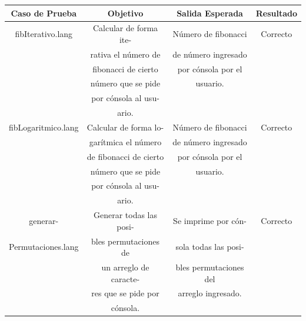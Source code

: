 \documentclass[11pt, spanish]{report}
\begin{document}
\begin{itemize}
  \begin{table}[!hbp]
    \begin{tabular}{c c c c}
      \hline            
      \hline            
      Caso de Prueba      & Objetivo               & Salida Esperada & Resultado \\ [0.5ex]
      \hline                         
      fibIterativo.lang   & Calcular de forma ite- & N\'umero de fibonacci & Correcto         \\ [1ex] 
                          & rativa el n\'umero de  & de n\'umero ingresado &                  \\ [1ex] 
                          & fibonacci de cierto    & por c\'onsola por el  &                  \\ [1ex] 
                          & n\'umero que se pide   & usuario.              &                  \\ [1ex] 
                          & por c\'onsola al usu-  &                       &                  \\ [1ex]   
                          & ario.                  &                       &                  \\ [1ex]   
      fibLogaritmico.lang & Calcular de forma lo-  & N\'umero de fibonacci & Correcto         \\ [1ex] 
                          & gar\'itmica el n\'umero& de n\'umero ingresado &                  \\ [1ex] 
                          & de fibonacci de cierto & por c\'onsola por el  &                  \\ [1ex] 
                          & n\'umero que se pide   & usuario.              &                  \\ [1ex] 
                          & por c\'onsola al usu-  &                       &                  \\ [1ex]   
                          & ario.                  &                       &                  \\ [1ex]   
      generar-            & Generar todas las posi-& Se imprime por c\'on- & Correcto         \\ [1ex] 
      Permutaciones.lang  & bles permutaciones de  & sola todas las posi-  &                  \\ [1ex] 
                          & un arreglo de caracte- & bles permutaciones del&                  \\ [1ex] 
                          & res que se pide por    & arreglo ingresado.    &                  \\ [1ex] 
                          & c\'onsola.             &                       &                  \\ [1ex] 
      \hline
    \end{tabular}    
  \end{table}


\end{itemize}
\end{document}
